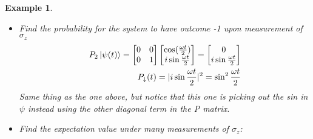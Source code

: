 \documentclass[12pt]{article}
\theoremstyle{plain}
\theoremstyle{nonumberplain}
\theoremstyle{plain}
\newtheorem{example}[lemma]{Example}
\theoremstyle{nonumberplain}
\newcommand\1{{\bf 1}}
\newcommand{\bmat}[1]{\begin{bmatrix*} #1 \end{bmatrix*}} %
\newcommand{\<}{\left\langle}
\renewcommand{\>}{\right\rangle}
\begin{document}
\begin{example}
\begin{itemize}
\begin{equation}
\begin{split}
P_2\ket{\psi(t)} = \bmat{1 &0\\ 0 &0}\bmat{\cos(\frac{\omega t}{2})\\ i\sin{\frac{\omega t}{2}}} = \bmat{\cos(\frac{\omega t}{2}) \\0}\\
P_\downarrow (t) = |\cos{\frac{\omega t}{2}}|^2 = \cos^2{\frac{\omega t}{2}}
\end{split}
\end{equation}
As you can see, we have picked off the cos out of $\psi$ and in order to compute the probability distribution of the wave, we square the final answer, this will look familiar to a probability and statistics class topic of expected values and distributions (because it is... Wow! never thought it would be useful again)  

\pagebreak
\item Find the probability for the system to have outcome -1 upon measurement of $\sigma_z$\\
\begin{equation}
\begin{split}
P_2\ket{\psi(t)} = \bmat{0 &0\\ 0 &1}\bmat{\cos(\frac{\omega t}{2})\\ i\sin{\frac{\omega t}{2}}} = \bmat{0 \\i\sin{\frac{\omega t}{2}}}\\
P_\downarrow (t) = |i\sin{\frac{\omega t}{2}}|^2 = \sin^2{\frac{\omega t}{2}}
\end{split}
\end{equation}
Same thing as the one above, but notice that this one is picking out the sin in $\psi$ instead using the other diagonal term in the P matrix.\\  
\item Find the expectation value under many measurements of $\sigma_z$:\\

\end{itemize}
\end{example}
\end{document}
